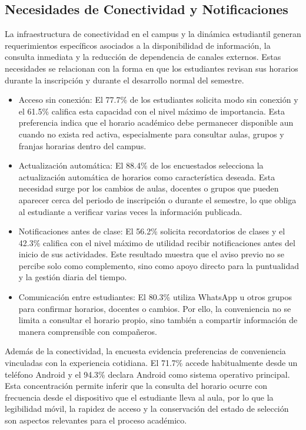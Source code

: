 \subsection{Necesidades de Conectividad y Notificaciones}

La infraestructura de conectividad en el campus y la dinámica estudiantil generan requerimientos específicos asociados a la disponibilidad de información, la consulta inmediata y la reducción de dependencia de canales externos. Estas necesidades se relacionan con la forma en que los estudiantes revisan sus horarios durante la inscripción y durante el desarrollo normal del semestre.

\begin{itemize}
    \item Acceso sin conexión: El 77.7\% de los estudiantes solicita modo sin conexión y el 61.5\% califica esta capacidad con el nivel máximo de importancia. Esta preferencia indica que el horario académico debe permanecer disponible aun cuando no exista red activa, especialmente para consultar aulas, grupos y franjas horarias dentro del campus.
    \item Actualización automática: El 88.4\% de los encuestados selecciona la actualización automática de horarios como característica deseada. Esta necesidad surge por los cambios de aulas, docentes o grupos que pueden aparecer cerca del periodo de inscripción o durante el semestre, lo que obliga al estudiante a verificar varias veces la información publicada.
    \item Notificaciones antes de clase: El 56.2\% solicita recordatorios de clases y el 42.3\% califica con el nivel máximo de utilidad recibir notificaciones antes del inicio de sus actividades. Este resultado muestra que el aviso previo no se percibe solo como complemento, sino como apoyo directo para la puntualidad y la gestión diaria del tiempo.
    \item Comunicación entre estudiantes: El 80.3\% utiliza WhatsApp u otros grupos para confirmar horarios, docentes o cambios. Por ello, la conveniencia no se limita a consultar el horario propio, sino también a compartir información de manera comprensible con compañeros.
\end{itemize}

Además de la conectividad, la encuesta evidencia preferencias de conveniencia vinculadas con la experiencia cotidiana. El 71.7\% accede habitualmente desde un teléfono Android y el 94.3\% declara Android como sistema operativo principal. Esta concentración permite inferir que la consulta del horario ocurre con frecuencia desde el dispositivo que el estudiante lleva al aula, por lo que la legibilidad móvil, la rapidez de acceso y la conservación del estado de selección son aspectos relevantes para el proceso académico.

